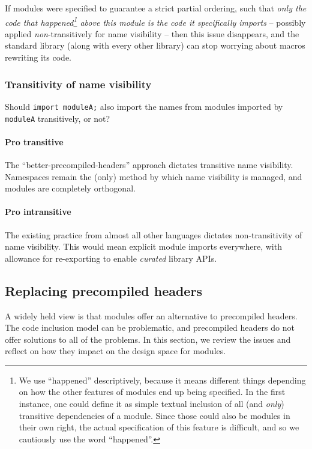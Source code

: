 \documentclass[reqno]{article}
\begin{document}
If modules were specified to guarantee a strict partial ordering, such that
\emph{only the code that happened\footnote{We use ``happened'' descriptively,
because it means different things depending on how the other features of
modules end up being specified. In the first instance, one could define it as
simple textual inclusion of all (and \emph{only}) transitive dependencies of a
module. Since those could also be modules in their own right, the actual
specification of this feature is difficult, and so we cautiously use the word
``happened''.} above this module is the code it specifically imports} --
possibly applied \emph{non}-transitively for name visibility -- then this issue
disappears, and the standard library (along with every other library) can stop
worrying about macros rewriting its code.

\subsubsection{Transitivity of name visibility}

Should \texttt{import moduleA;} also import the names from modules imported by
\texttt{moduleA} transitively, or not?

\paragraph{Pro transitive}

The ``better-precompiled-headers'' approach dictates transitive name
visibility. Namespaces remain the (only) method by which name visibility is
managed, and modules are completely orthogonal.

\paragraph{Pro intransitive}

The existing practice from almost all other languages dictates non-transitivity
of name visibility. This would mean explicit module imports everywhere, with
allowance for re-exporting to enable \emph{curated} library APIs.


\subsection{Replacing precompiled headers}

A widely held view is that modules offer an alternative to precompiled headers.
The code inclusion model can be problematic, and precompiled headers do not
offer solutions to all of the problems. In this section, we review the issues
and reflect on how they impact on the design space for modules.
\end{document}
